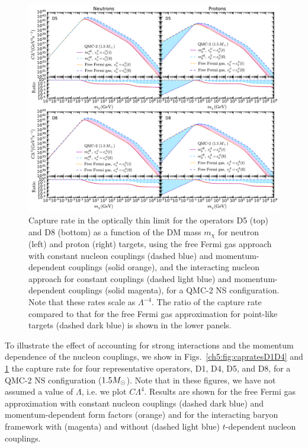 \begin{figure}[t!bp] 
\centering
\includegraphics[width=\textwidth]{capture_3/C_mDM_N_QMC_D5_D8_ratio.pdf}
\caption[Capture rate in the optically thin limit for the operators D5 (top) and D8 (bottom) as a function of the DM mass $m_\chi$ for neutron (left) and proton (right) targets, for a QMC-2 NS configuration.]{
Capture rate in the optically thin limit for the operators D5 (top) and D8 (bottom) as a function of the DM mass $m_\chi$ for neutron (left) and proton (right) targets,
using the free Fermi gas approach with constant nucleon couplings (dashed blue) and momentum-dependent couplings (solid orange), and the interacting nucleon approach for constant couplings (dashed light blue)  and momentum-dependent couplings (solid magenta), for a QMC-2 NS configuration. 
Note that these rates scale as $\Lambda^{-4}$. 
The ratio of the capture rate compared to that for the free Fermi gas approximation for point-like targets (dashed dark blue) is shown in the lower panels. 
}
\label{ch5:fig:capratesD5D8}
\end{figure} 

To illustrate the effect of accounting for strong interactions and the momentum dependence of the nucleon couplings, we show in  Figs.~\ref{ch5:fig:capratesD1D4} and \ref{ch5:fig:capratesD5D8} the capture rate for four representative operators, D1, D4, D5, and D8, for a QMC-2 NS configuration ($1.5M_\odot$). 
Note that in these figures, we have not assumed a value of $\Lambda$, i.e. we plot $C \Lambda^4$. 
Results are shown for the free Fermi gas approximation with constant nucleon couplings (dashed dark blue) and momentum-dependent form factors (orange) and for the interacting baryon framework with (magenta) and without (dashed light blue) $t$-dependent nucleon couplings.
 

